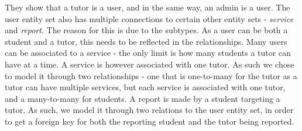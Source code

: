 They show that a tutor is a user, and in the same way, an admin is a user.
The user entity set also has multiple connections to certain other entity sets - \textit{service} and \textit{report}.
The reason for this is due to the subtypes. 
As a user can be both a student and a tutor, this needs to be reflected in the relationships.
Many users can be associated to a service - the only limit is how many students a tutor can have at a time.
A service is however associated with one tutor.
As such we chose to model it through two relationships - one that is one-to-many for the tutor as a tutor can have multiple services, but each service is associated with one tutor, and a many-to-many for students.
A report is made by a student targeting a tutor. 
As such, we model it through two relations to the user entity set, in order to get a foreign key for both the reporting student and the tutor being reported.
